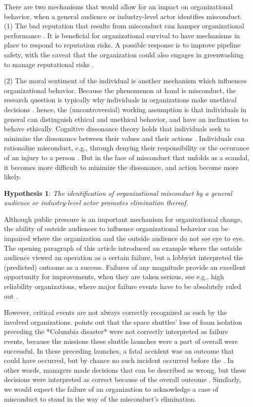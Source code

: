There are two mechanisms that would allow for an impact on organizational behavior, when a general audience or industry-level actor identifies misconduct. (1) The bad reputation that results from misconduct can hamper organizational performance \citep{Park2019}. It is beneficial for organizational survival to have mechanisms in place to respond to reputation risks. A possible response is to improve pipeline safety, with the caveat that the organization could also engages in greenwashing to manage reputational risks \citep{Kim2015, Lyon2015}.

(2) The moral sentiment of the individual is another mechanism which influences organizational behavior. Because the phenomenon at hand is misconduct, the research question is typically why individuals in organizations make unethical decisions \citep[e.g.,][]{Moore2008}. hence, the (uncontroversial) working assumption is that individuals in general can distinguish ethical and unethical behavior, and have an inclination to behave ethically. Cognitive dissonance theory holds that individuals seek to minimize the dissonance between their values and their actions \citep{Festinger1962}. Individuals can rationalize misconduct, e.g., through denying their responsibility or the occurance of an injury to a person \citep{Ashforth2003}. But in the face of misconduct that unfolds as a scandal, it becomes more difficult to minimize the dissonance, and action become more likely.

\textbf{Hypothesis 1}: \textit{The identification of organizational misconduct by a general audience or industry-level actor promotes elimination thereof.}

Although public pressure is an important mechanism for organizational change, the ability of outside audiences to influence organizational behavior can be impaired where the organization and the outside audience do not see eye to eye. The opening paragraph of this article introduced an example where the outside audience viewed an operation as a certain failure, but a lobbyist interpreted the (predicted) outcome as a success. Failures of any magnitude provide an excellent opportunity for improvements, when they are taken serious, see e.g., high reliability organizations, where major failure events have to be absolutely ruled out \citep{Carroll1998}.

However, critical events are not always correctly recognized as such by the involved organizations. \citep{Madsen2010} points out that the space shuttles' loss of foam isolation preceding the *Columbia disaster* were not correctly interpreted as failure events, because the missions these shuttle launches were a part of overall were successful. In these preceding launches, a fatal accident was an outcome that could have occurred, but by chance no such incident occurred before the \citep{Madsen2010}. In other words, managers made decisions that can be described as wrong, but these decisions were interpreted as correct because of the overall outcome \citep{Dillon2008}. Similarly, we would expect the failure of an organization to acknowledge a case of misconduct to stand in the way of the misconduct's elimination.

